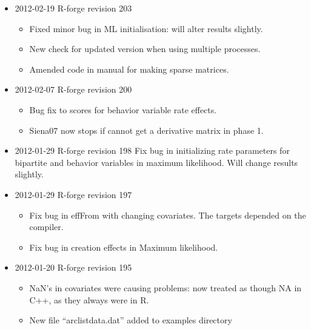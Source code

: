 \documentclass[a4paper,fleqn,11pt]{article}
\newcommand{\+}{\, + \,}
\begin{document}
{\begin{small}
\begin{itemize}
\begin{itemize}
\item Fixed bug causing occasional failure in maximum likelihood with
  constraints.
\item Added error message if try to use maximum likelihood with composition
  change.
\item Fixed bug in endowment and creation effect score calculation for symmetric
  network pairwise models.
\item File cluster.out is now removed before recreation.
\item Meta analysis summary now does not contain a list of NULLs at the end.
\item Minor changes to print and messages formats.
\end{itemize}
\item 2012-02-19 R-forge revision 203
\begin{itemize}
\item Fixed minor bug in ML initialisation: will alter results slightly.
\item New check for updated version when using multiple processes.
\item Amended code in manual for making sparse matrices.
\end{itemize}
\item 2012-02-07 R-forge revision 200
\begin{itemize}
\item Bug fix to scores for behavior variable rate effects.
\item Siena07 now stops if cannot get a derivative matrix in phase 1.
\end{itemize}
\item 2012-01-29 R-forge revision 198
Fix bug in initializing rate parameters for bipartite and behavior variables in
maximum likelihood. Will change results slightly.
\item 2012-01-29 R-forge revision 197
\begin{itemize}
\item Fix bug in effFrom with changing covariates. The targets depended on the
compiler.
\item Fix bug in creation effects in Maximum likelihood.
\end{itemize}
\item 2012-01-20 R-forge revision 195
\begin{itemize}
\item NaN's in covariates were causing problems: now treated as though NA
    in C++, as they always were in R.
\item New file ``arclistdata.dat'' added to examples directory

\end{itemize}
\end{itemize}
\end{small}}
\end{document}
